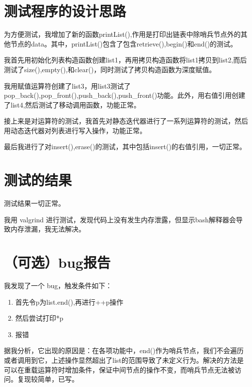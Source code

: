\documentclass[UTF8]{ctexart}
\begin{document}
\pagestyle{fancy}
\fancyhead{}

\section{测试程序的设计思路}

为方便测试，我增加了新的函数printList(),作用是打印出链表中除哨兵节点外的其他节点的data。其中，printList()包含了包含retrieve(),begin()和end()的测试。

我首先用初始化列表构造函数创建list1，再用拷贝构造函数将list1拷贝到list2,而后测试了size(),empty(),和clear()，同时测试了拷贝构造函数为深度赋值。

我用赋值运算符创建了list3，用list3测试了pop\_back(),pop\_front(),push\_back(),push\_front()功能。此外，用右值引用创建了list4,然后测试了移动调用函数，功能正常。

接上来是对运算符的测试，我首先对静态迭代器进行了一系列运算符的测试，然后用动态迭代器对列表进行写入操作，功能正常。

最后我进行了对insert(),erase()的测试，其中包括insert()的右值引用，一切正常。



\section{测试的结果}

测试结果一切正常。

我用 valgrind 进行测试，发现代码上没有发生内存泄露，但显示bash解释器会导致内存泄漏，我无法解决。

\section{（可选）bug报告}

我发现了一个 bug，触发条件如下：

\begin{enumerate}
    \item 首先令p为list.end(),再进行++p操作
    \item 然后尝试打印*p
    \item 报错
\end{enumerate}

据我分析，它出现的原因是：在各项功能中，end()作为哨兵节点，我们不会遍历或者调用到它，上述操作显然超出了list的范围导致了未定义行为。解决的方法是可以在重载运算符时增加条件，保证中间节点的操作不变，而哨兵节点无法被访问。复现较简单，已写。
\end{document}
